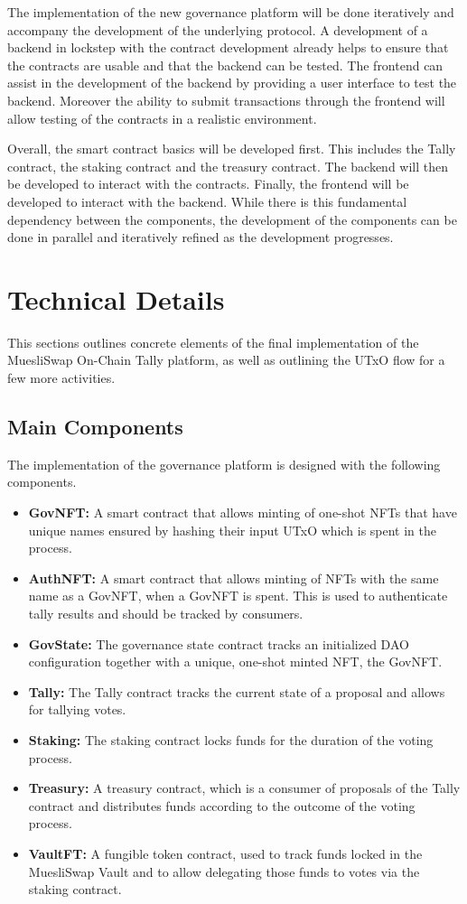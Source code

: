 \documentclass[11pt]{article}
\begin{document}
The implementation of the new governance platform will be done iteratively and accompany the development of the underlying protocol.
A development of a backend in lockstep with the contract development already helps to ensure that the contracts are usable and that the backend can be tested.
The frontend can assist in the development of the backend by providing a user interface to test the backend.
Moreover the ability to submit transactions through the frontend will allow testing of the contracts in a realistic environment.

Overall, the smart contract basics will be developed first.
This includes the Tally contract, the staking contract and the treasury contract.
The backend will then be developed to interact with the contracts.
Finally, the frontend will be developed to interact with the backend.
While there is this fundamental dependency between the components, the development of the components can be done in parallel and iteratively refined as the development progresses.


\section{Technical Details}

This sections outlines concrete elements of the final implementation of the MuesliSwap On-Chain Tally platform,
as well as outlining the UTxO flow for a few more activities.

\subsection{Main Components}

The implementation of the governance platform is designed with the following components.
\begin{itemize}
    \item \textbf{GovNFT:} A smart contract that allows minting of one-shot NFTs that have unique names ensured by hashing their input UTxO which is spent in the process.
    \item \textbf{AuthNFT:} A smart contract that allows minting of NFTs with the same name as a GovNFT, when a GovNFT is spent. This is used to authenticate tally results and should be tracked by consumers.
    \item \textbf{GovState:} The governance state contract tracks an initialized DAO configuration together with a unique, one-shot minted NFT, the GovNFT.
    \item \textbf{Tally:} The Tally contract tracks the current state of a proposal and allows for tallying votes.
    \item \textbf{Staking:} The staking contract locks funds for the duration of the voting process.
    \item \textbf{Treasury:} A treasury contract, which is a consumer of proposals of the Tally contract and distributes funds according to the outcome of the voting process.
    \item \textbf{VaultFT:} A fungible token contract, used to track funds locked in the MuesliSwap Vault and to allow delegating those funds to votes via the staking contract.
\end{itemize}
\end{document}
